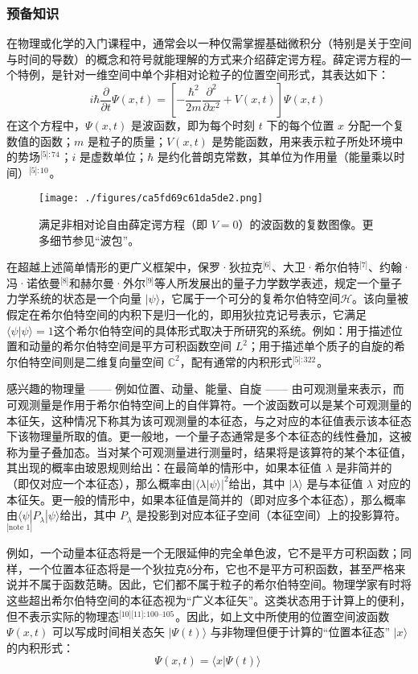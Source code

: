 \subsubsection{预备知识}
在物理或化学的入门课程中，通常会以一种仅需掌握基础微积分（特别是关于空间与时间的导数）的概念和符号就能理解的方式来介绍薛定谔方程。薛定谔方程的一个特例，是针对一维空间中单个非相对论粒子的位置空间形式，其表达如下：
$$
i\hbar \frac{\partial}{\partial t}\Psi(x,t) = \left[ -\frac{\hbar^2}{2m} \frac{\partial^2}{\partial x^2} + V(x,t) \right] \Psi(x,t)~
$$
在这个方程中，$\Psi(x, t)$ 是波函数，即为每个时刻 $t$ 下的每个位置 $x$ 分配一个复数值的函数；$m$ 是粒子的质量；$V(x, t)$ 是势能函数，用来表示粒子所处环境中的势场\(^\text{[5]: 74 }\)；$i$ 是虚数单位；$\hbar$ 是约化普朗克常数，其单位为作用量（能量乘以时间）\(^\text{[5]: 10 }\)。
\begin{figure}[ht]
\centering
\texttt{[image: ./figures/ca5fd69c61da5de2.png]}
\caption{满足非相对论自由薛定谔方程（即 $V = 0$）的波函数的复数图像。更多细节参见“波包”。} \label{fig_XDEfc_1}
\end{figure}
在超越上述简单情形的更广义框架中，保罗·狄拉克\(^\text{[6]}\)、大卫·希尔伯特\(^\text{[7]}\)、约翰·冯·诺依曼\(^\text{[8]}\)和赫尔曼·外尔\(^\text{[9]}\)等人所发展出的量子力学数学表述，规定一个量子力学系统的状态是一个向量 $|\psi\rangle$，它属于一个可分的复希尔伯特空间$\mathcal{H}$。该向量被假定在希尔伯特空间的内积下是归一化的，即用狄拉克记号表示，它满足$\langle \psi | \psi \rangle = 1$这个希尔伯特空间的具体形式取决于所研究的系统。例如：用于描述位置和动量的希尔伯特空间是平方可积函数空间 $L^2$；用于描述单个质子的自旋的希尔伯特空间则是二维复向量空间 $\mathbb{C}^2$，配有通常的内积形式\(^\text{[5]: 322 }\)。

感兴趣的物理量 —— 例如位置、动量、能量、自旋 —— 由可观测量来表示，而可观测量是作用于希尔伯特空间上的自伴算符。一个波函数可以是某个可观测量的本征矢，这种情况下称其为该可观测量的本征态，与之对应的本征值表示该本征态下该物理量所取的值。更一般地，一个量子态通常是多个本征态的线性叠加，这被称为量子叠加态。当对某个可观测量进行测量时，结果将是该算符的某个本征值，其出现的概率由玻恩规则给出：在最简单的情形中，如果本征值 $\lambda$ 是非简并的（即仅对应一个本征态），那么概率由$|\langle \lambda | \psi \rangle |^2$给出，其中 $|\lambda\rangle$ 是与本征值 $\lambda$ 对应的本征矢。更一般的情形中，如果本征值是简并的（即对应多个本征态），那么概率由$\langle \psi | P_{\lambda} | \psi \rangle$给出，其中 $P_{\lambda}$ 是投影到对应本征子空间（本征空间）上的投影算符。\(^\text{[note 1]}\)

例如，一个动量本征态将是一个无限延伸的完全单色波，它不是平方可积函数；同样，一个位置本征态将是一个狄拉克δ分布，它也不是平方可积函数，甚至严格来说并不属于函数范畴。因此，它们都不属于粒子的希尔伯特空间。物理学家有时将这些超出希尔伯特空间的本征态视为“广义本征矢”。这类状态用于计算上的便利，但不表示实际的物理态\(^\text{[10][11]: 100–105}\) 。因此，如上文中所使用的位置空间波函数 $\Psi(x, t)$ 可以写成时间相关态矢 $|\Psi(t)\rangle$ 与非物理但便于计算的“位置本征态” $|x\rangle$ 的内积形式：
$$
\Psi(x, t) = \langle x | \Psi(t) \rangle~
$$
